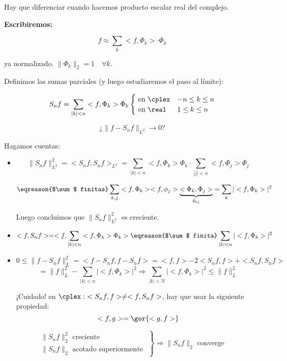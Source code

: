 		\obs Hay que diferenciar cuando hacemos producto escalar real del complejo.

		\textbf{Escribiremos:}

		\[ f ≈ \sum_k <f, \Phi_k> \cdot \Phi_k \]

		ya normalizado. $\|\Phi_k\|_2 = 1 \quad \forall k$.

		Definimos las sumas parciales (y luego estudiaremos el paso al límite):

		\[
		S_n f = \sum_{|k| < n} <f, \Phi_k> \Phi_k \begin{cases}
			\text{ en } \cplex & -n \leq k \leq n \\
			\text{ en } \real & 1 \leq k \leq n
		\end{cases}
		\]

		\[ \text{¿} \| f - S_n f \|_{L^2} \rightarrow 0 \text{?}\]

		Hagamos cuentas:

		\begin{itemize}

			\item
			\[ \|S_n f\|_{L^2}^2 = < S_n f, S_n f>_{L^2} = \sum_{|k| < n} <f, \Phi_k> \Phi_k \cdot \sum_{|j| < n} <f, \Phi_j> \Phi_j \]

			\[ \eqreason{$\sum$ finitas} \sum_{k,j} <f, \Phi_k><f, \phi_j>\underbrace{<\Phi_k, \Phi_j>}_{\delta_{kj}} = \sum_k | <f, \Phi_k> |^2
			\]

			Luego concluimos que $\|S_n f\|_{L^2}^2$ es creciente.

			\item
			\[
				<f, S_n f> = <f, \sum_{|k| < n} <f, \Phi_k> \Phi_k > \eqreason{$\sum$ finita} \sum_{|k| < n} | <f, \Phi_k> |^2
			\]

			\item
			\[
				0 \leq \|f - S_n f\|^2_{L} = <f - S_n f, f- S_n f> = <f,f> - 2 <S_n f, f> + <S_n f, S_n f>
			\]
			\[ = \|f\|_{L}^2 - \sum_{|k| < n} |<f, \Phi_k>|^2 \Rightarrow \sum_{|k| < N} |<f, \Phi_k>|^2 \leq \|f\|_L^2 \]

			\obs ¡Cuidado! en $\cplex: \ <S_n f, f> \neq < f, S_n f>$, hay que usar la siguiente propiedad:
			$$<f,g> = \gor{<g,f>} $$
		\end{itemize}

		\obs  \[
			\left.
			\begin{array}{l}
				\|S_n f\|^2_2 \text{ creciente } \\
				\|S_n f\|_2 \text{ acotado superiormente }
			\end{array}
			\right\} \Rightarrow \|S_n f\|_{2} \text{ converge }
		\]

